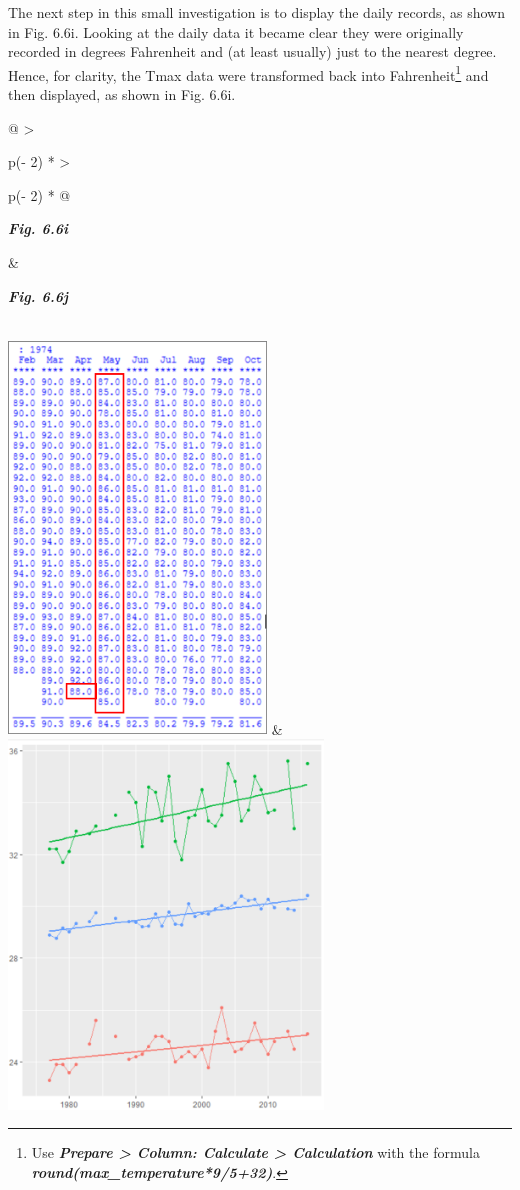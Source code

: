 \documentclass[
  letterpaper,
  DIV=11,
  numbers=noendperiod]{scrreprt}
\begin{document}
The next step in this small investigation is to display the daily
records, as shown in Fig. 6.6i. Looking at the daily data it became
clear they were originally recorded in degrees Fahrenheit and (at least
usually) just to the nearest degree. Hence, for clarity, the Tmax data
were transformed back into Fahrenheit\footnote{Use \textbf{\emph{Prepare
  \textgreater{} Column: Calculate \textgreater{} Calculation}} with the
  formula \textbf{\emph{round(max\_temperature*9/5+32)}}.} and then
displayed, as shown in Fig. 6.6i.

\begin{longtable}[]{@{}
  >{\raggedright\arraybackslash}p{(\columnwidth - 2\tabcolsep) * }
  >{\raggedright\arraybackslash}p{(\columnwidth - 2\tabcolsep) * }@{}}
\toprule\noalign{}
\begin{minipage}[b]{\linewidth}\raggedright
\textbf{\emph{Fig. 6.6i}}
\end{minipage} & \begin{minipage}[b]{\linewidth}\raggedright
\textbf{\emph{Fig. 6.6j}}
\end{minipage} \\
\midrule\noalign{}
\endhead
\bottomrule\noalign{}
\endlastfoot
\includegraphics[width=2.69896in,height=4.11481in]{figures/Fig6.6i.png}
&
\includegraphics[width=3.29566in,height=3.85672in]{figures/Fig6.6j.png} \\

\end{longtable}
\end{document}
